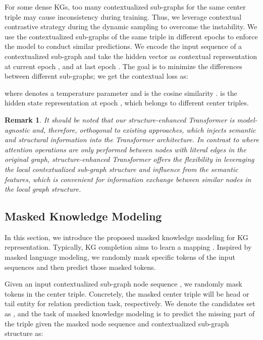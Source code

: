\documentclass[sigconf]{acmart}
\newtheorem{remark}{\noindent \textbf{Remark}}
\begin{document}
For some dense KGs, too many contextualized sub-graphs for the same center triple may cause inconsistency during training.
Thus, we leverage contextual contrastive strategy during the dynamic sampling to overcome the instability.
We use the contextualized sub-graphs of the same triple in different epochs to enforce the model to conduct similar predictions.
We encode the input sequence of a contextualized sub-graph and take the hidden vector  as contextual representation  at current epoch , and  at last epoch . The goal is to minimize the differences between different sub-graphs; we get the contextual loss  as:

\begin{small}

\end{small}

where  denotes a temperature parameter and  is the cosine similarity .
 is the hidden state representation at epoch , which belongs to different center triples.

\begin{remark}
It should be noted that our structure-enhanced Transformer is model-agnostic and, therefore, orthogonal to existing approaches, which injects semantic and structural information into the Transformer architecture.
In contrast to \cite{transformers} where attention operations are only performed between nodes with literal edges in the original graph, structure-enhanced Transformer offers the flexibility in leveraging the local contextualized sub-graph structure and influence from the semantic features, which is convenient for information exchange between similar nodes in the local graph structure. 
\end{remark}

\subsection{Masked Knowledge Modeling}
\label{sec:MKM}
In this section, we introduce the proposed masked knowledge modeling for KG representation.
Typically, KG completion aims to learn a mapping .
Inspired by masked language modeling, we randomly mask specific tokens of the input sequences and then predict those masked tokens.

Given an input contextualized sub-graph node sequence , we randomly mask tokens in the center triple.
Concretely, the masked center triple will be head or tail entity for relation prediction task, respectively.
We denote the candidates set as , and the task of masked knowledge modeling is to predict the missing part of the triple  given the masked node sequence  and contextualized sub-graph structure  as:
\end{document}
